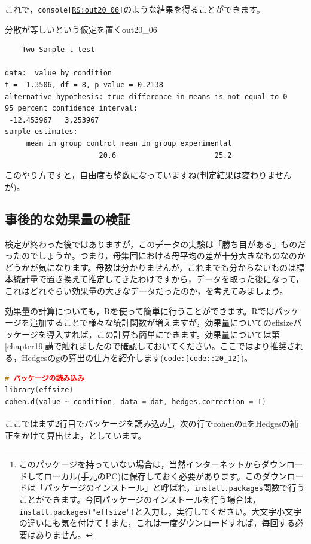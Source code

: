 \documentclass{ltjsbook}
\begin{document}
これで，\texttt{console\ref{RS:out20_06}}のような結果を得ることができます。

\begin{Rscreen}{分散が等しいという仮定を置く}{out20_06}
\begin{verbatim}
	Two Sample t-test

data:  value by condition
t = -1.3506, df = 8, p-value = 0.2138
alternative hypothesis: true difference in means is not equal to 0
95 percent confidence interval:
 -12.453967   3.253967
sample estimates:
     mean in group control mean in group experimental 
                      20.6                       25.2 
\end{verbatim}
\end{Rscreen}
このやり方ですと，自由度も整数になっていますね(判定結果は変わりませんが)。

\subsection{事後的な効果量の検証}
検定が終わった後ではありますが，このデータの実験は「勝ち目がある」ものだったのでしょうか。つまり，母集団における母平均の差が十分大きなものなのかどうかが気になります。母数は分かりませんが，これまでも分からないものは標本統計量で置き換えて推定してきたわけですから，データを取った後になって，これはどれぐらい効果量の大きなデータだったのか，を考えてみましょう。

効果量の計算についても，Rを使って簡単に行うことができます。Rではパッケージを追加することで様々な統計関数が増えますが，効果量についての\textsf{effsize}パッケージ\citep{effsize}を導入すれば，この計算も簡単にできます。効果量については第\ref{chapter19}講で触れましたので確認しておいてください。ここではより推奨される，Hedgesのgの算出の仕方を紹介します(\texttt{code:\ref{code::20_12}})。

\begin{lstlisting}[language=c++,label={code::20_12},caption={効果量を求める}]
# パッケージの読み込み
library(effsize)
cohen.d(value ~ condition, data = dat, hedges.correction = T)
\end{lstlisting}
ここではまず2行目でパッケージを読み込み\footnote{このパッケージを持っていない場合は，当然インターネットからダウンロードしてローカル(手元のPC)に保存しておく必要があります。このダウンロードは「パッケージのインストール」と呼ばれ，\texttt{install.packages}関数で行うことができます。今回パッケージのインストールを行う場合は，\texttt{install.packages("effsize")}と入力し，実行してください。大文字小文字の違いにも気を付けて！また，これは一度ダウンロードすれば，毎回する必要はありません。}，次の行でcohenのdをHedgesの補正をかけて算出せよ，としています。
\end{document}
